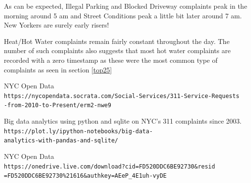 \documentclass[12pt,a4paper]{article}
\begin{document}
As can be expected, Illegal Parking and Blocked Driveway complaints peak in the morning around 5 am and Street Conditions peak a little bit later around 7 am. New Yorkers are surely early risers!

Heat/Hot Water complaints remain fairly constant throughout the day. The number of such complaints also suggests that most hot water complaints are recorded with a zero timestamp as these were the most common type of complaints as seen in section \ref{top25}


\begin{thebibliography}{9}
NYC Open Data
\\\texttt{https://nycopendata.socrata.com/Social-Services/311-Service-Requests\\-from-2010-to-Present/erm2-nwe9}


Big data analytics using python and sqlite on NYC's 311 complaints since 2003.
\\\texttt{https://plot.ly/ipython-notebooks/big-data-\\analytics-with-pandas-and-sqlite/}

NYC Open Data
\\\texttt{https://onedrive.live.com/download?cid=FD520DDC6BE92730\&resid\\=FD520DDC6BE92730\%21616\&authkey=AEeP\_4E1uh-vyDE}


\end{thebibliography}
\end{document}
